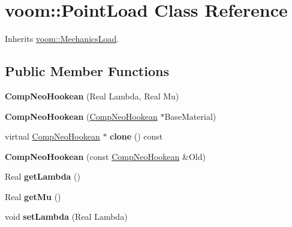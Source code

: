 \hypertarget{classvoom_1_1_point_load}{
\section{voom::PointLoad Class Reference}
\label{classvoom_1_1_point_load}
}


Inherits \hyperlink{classvoom_1_1_mechanics_load}{voom::MechanicsLoad}.\subsection*{Public Member Functions}
\begin{DoxyCompactItemize}
\item 
\hypertarget{classvoom_1_1_point_load_aead517a1539039911e2e2f48cf5f1b1c}{
{\bfseries CompNeoHookean} (Real Lambda, Real Mu)}
\label{classvoom_1_1_point_load_aead517a1539039911e2e2f48cf5f1b1c}

\item 
\hypertarget{classvoom_1_1_point_load_a9402bdb020c7849ce55e302581bcc58e}{
{\bfseries CompNeoHookean} (\hyperlink{classvoom_1_1_comp_neo_hookean}{CompNeoHookean} $\ast$BaseMaterial)}
\label{classvoom_1_1_point_load_a9402bdb020c7849ce55e302581bcc58e}

\item 
\hypertarget{classvoom_1_1_point_load_ab1f915f22cb6ee8d0a683e2df37eb1a8}{
virtual \hyperlink{classvoom_1_1_comp_neo_hookean}{CompNeoHookean} $\ast$ {\bfseries clone} () const }
\label{classvoom_1_1_point_load_ab1f915f22cb6ee8d0a683e2df37eb1a8}

\item 
\hypertarget{classvoom_1_1_point_load_a4415e68b0dc554a7328ba0cc909d2234}{
{\bfseries CompNeoHookean} (const \hyperlink{classvoom_1_1_comp_neo_hookean}{CompNeoHookean} \&Old)}
\label{classvoom_1_1_point_load_a4415e68b0dc554a7328ba0cc909d2234}

\item 
\hypertarget{classvoom_1_1_point_load_a20ce9dda8a8e38688a12f615c82eb484}{
Real {\bfseries getLambda} ()}
\label{classvoom_1_1_point_load_a20ce9dda8a8e38688a12f615c82eb484}

\item 
\hypertarget{classvoom_1_1_point_load_a432424d0478d922b401417fd06b6db78}{
Real {\bfseries getMu} ()}
\label{classvoom_1_1_point_load_a432424d0478d922b401417fd06b6db78}

\item 
\hypertarget{classvoom_1_1_point_load_aeea105026ecd685fe76aa4e913f37606}{
void {\bfseries setLambda} (Real Lambda)}
\label{classvoom_1_1_point_load_aeea105026ecd685fe76aa4e913f37606}


\end{DoxyCompactItemize}
